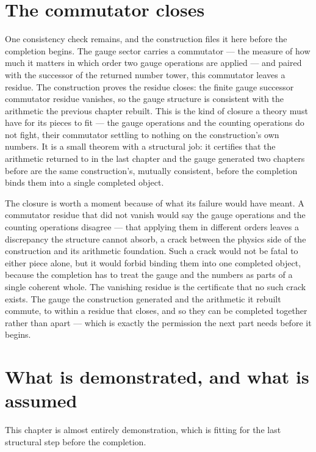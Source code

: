 \section{The commutator closes}
\label{se:the-commutator-closes}

One consistency check remains, and the construction files it here before the completion begins. The gauge
sector carries a commutator --- the measure of how much it matters in which order two gauge operations are
applied --- and paired with the successor of the returned number tower, this commutator leaves a residue.
The construction proves the residue closes: the finite gauge successor commutator residue vanishes, so
the gauge structure is consistent with the arithmetic the previous chapter rebuilt. This is the kind of
closure a theory must have for its pieces to fit --- the gauge operations and the counting operations do
not fight, their commutator settling to nothing on the construction's own numbers. It is a small theorem
with a structural job: it certifies that the arithmetic returned to in the last chapter and the gauge
generated two chapters before are the same construction's, mutually consistent, before the completion
binds them into a single completed object.

The closure is worth a moment because of what its failure would have meant. A commutator residue that did
not vanish would say the gauge operations and the counting operations disagree --- that applying them in
different orders leaves a discrepancy the structure cannot absorb, a crack between the physics side of the
construction and its arithmetic foundation. Such a crack would not be fatal to either piece alone, but it
would forbid binding them into one completed object, because the completion has to treat the gauge and the
numbers as parts of a single coherent whole. The vanishing residue is the certificate that no such crack
exists. The gauge the construction generated and the arithmetic it rebuilt commute, to within a residue
that closes, and so they can be completed together rather than apart --- which is exactly the permission
the next part needs before it begins.

\section{What is demonstrated, and what is assumed}
\label{se:demonstrated-assumed-ch23}

This chapter is almost entirely demonstration, which is fitting for the last structural step before the
completion.

